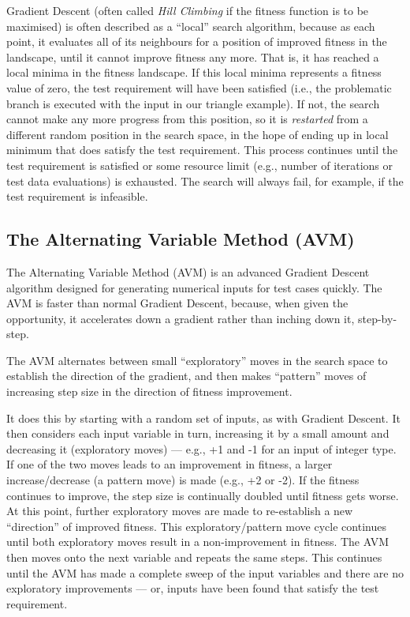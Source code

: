 Gradient Descent (often called {\it Hill Climbing} if the fitness function is to
be maximised) is often described as a ``local'' search algorithm, because as
each point, it evaluates all of its neighbours for a position of improved
fitness in the landscape, until it cannot improve fitness any more. That is, it
has reached a local minima in the fitness landscape. If this local minima
represents a fitness value of zero, the test requirement will have been
satisfied (i.e., the problematic branch is executed with the input in our
triangle example). If not, the search cannot make any more progress from this
position, so it is {\it restarted} from a different random position in the
search space, in the hope of ending up in local minimum that does satisfy the
test requirement. This process continues until the test requirement is satisfied
or some resource limit (e.g., number of iterations or test data evaluations) is
exhausted. The search will always fail, for example, if the test requirement is
infeasible. 

\subsection{The Alternating Variable Method (AVM)}

The Alternating Variable Method (AVM) is an advanced Gradient Descent algorithm
designed for generating numerical inputs for test cases quickly. The AVM is
faster than normal Gradient Descent, because, when given the opportunity, it
accelerates down a gradient rather than inching down it, step-by-step. 

The AVM alternates between small ``exploratory'' moves in the search space to
establish the direction of the gradient, and then makes ``pattern'' moves of
increasing step size in the direction of fitness improvement. 

It does this by starting with a random set of inputs, as with Gradient Descent.
It then considers each input variable in turn, increasing it by a small amount
and decreasing it (exploratory moves) --- e.g., +1 and -1 for an input of
integer type. If one of the two moves leads to an improvement in fitness, a
larger increase/decrease (a pattern move) is made (e.g., +2 or -2). If the
fitness continues to improve, the step size is continually doubled until fitness
gets worse. At this point, further exploratory moves are made to re-establish a
new ``direction'' of improved fitness. This exploratory/pattern move cycle
continues until both exploratory moves result in a non-improvement in fitness.
The AVM then moves onto the next variable and repeats the same steps. This
continues until the AVM has made a complete sweep of the input variables and
there are no exploratory improvements --- or, inputs have been found that
satisfy the test requirement.

